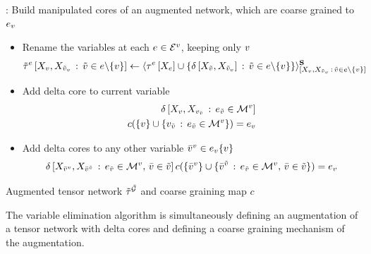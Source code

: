 \begin{algorithm}[hbt!]
\begin{algorithmic}
            : Build manipulated cores of an augmented network, which are coarse grained to $e_{v}$
            \begin{itemize}
                \item  Rename the variables at each $e\in\mathcal{E}^{v}$, keeping only $v$
                \begin{align*}
                    \tilde{\tau}^{e}\left[X_{v},X_{\tilde{v}_{v}}\,:\, \tilde{v}\in e\backslash\{v\}\right] \leftarrow
                    \langle
                        \tau^{e}\left[X_{e}\right]
                        \cup \{\delta\left[X_{\tilde{v}},X_{\tilde{v}_{v}}\right] \,:\, \tilde{v}\in e\backslash\{v\}\}
                    \rangle^{\mathbf{S}}_{[
                        X_{v},X_{\tilde{v}_{v}}\,:\, \tilde{v}\in e\backslash\{v\}
                    ]}
                \end{align*}
                \item Add delta core to current variable
                \begin{align*}
                    \delta\left[X_{v},X_{v_{\tilde{v}}}\,:\,e_{\tilde{v}}\in\mathcal{M}^{v}\right] \\
                    c(\{v\}\cup\{v_{\tilde{v}}\,:\,e_{\tilde{v}}\in\mathcal{M}^{v}\}) = e_{v}
                \end{align*}
                \item Add delta cores to any other variable $\bar{v}^{v}\in e_{v}\{v\}$
                \begin{align*}
                    \delta\left[X_{\bar{v}^{v}},X_{\bar{v}^{\tilde{v}}}\,:\,e_{\tilde{v}}\in\mathcal{M}^{v},\,\bar{v}\in\tilde{v}\right]
                    c(\{\bar{v}^{v}\}\cup\{\bar{v}^{\tilde{v}}\,:\,e_{\tilde{v}}\in\mathcal{M}^{v},\,\bar{v}\in\tilde{v}\}) = e_{v}
                \end{align*}
            \end{itemize}
        \EndFor
        \State \Return Augmented tensor network $\tilde{\tau}^{\tilde{\mathcal{G}}}$ and coarse graining map $c$
    \end{algorithmic}
\end{algorithm}

The variable elimination algorithm is simultaneously defining an augmentation of a tensor network with delta cores and defining a coarse graining mechanism of the augmentation.


